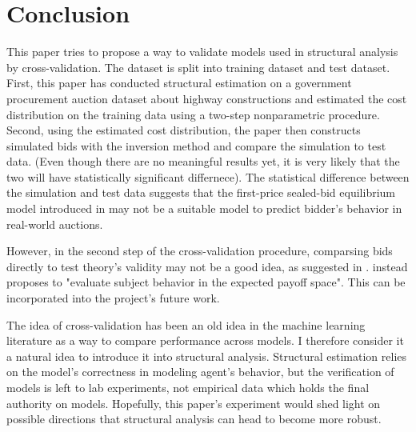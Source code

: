 \documentclass[11pt]{article}
\begin{document}
\section{Conclusion}
This paper tries to propose a way to validate models used in structural analysis 
by cross-validation. The dataset is split into training dataset and test 
dataset.
First, this paper has conducted structural estimation on a government 
procurement auction dataset about highway constructions and estimated the 
cost distribution on the training data using a two-step nonparametric procedure.
Second, using the 
estimated cost distribution, the paper then constructs simulated bids with the 
inversion method and compare the simulation to test data. 
(Even though there are no meaningful results yet, it is very likely that 
the two will have statistically significant differnece). 
The statistical difference between the simulation and test data suggests that 
the first-price sealed-bid equilibrium model introduced in \citeauthor{RileySamuelson1981} 
\citeyear{RileySamuelson1981} may not be a suitable model to predict bidder's 
behavior in real-world auctions. 

However, in the second step of the cross-validation procedure, comparsing bids 
directly to test theory's validity may not be a good idea, as suggested in 
\citeauthor{Harrison1989} \citeyear{Harrison1989}. \citeauthor{Harrison1989}
\citeyear{Harrison1989} instead proposes to "evaluate subject behavior in the 
expected payoff space". This can be incorporated into the project's future work.

The idea of cross-validation has been an old idea in the machine learning 
literature as a way to compare performance across models. I therefore consider 
it a natural idea to introduce it into structural analysis. Structural estimation 
relies on the model's correctness in modeling agent's behavior, but the verification 
of models is left to lab experiments, not empirical data which holds the final 
authority on models. Hopefully, this paper's experiment would shed light on 
possible directions that structural analysis can head to become more robust. 


\medskip



\end{document}
